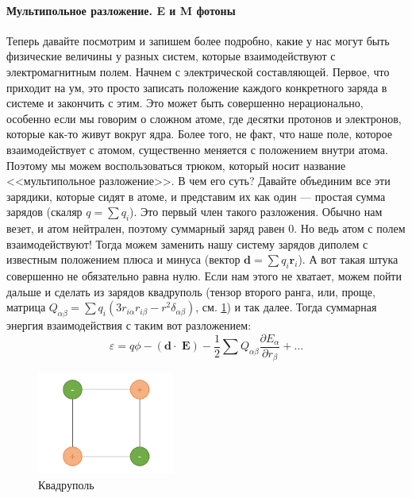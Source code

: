 \documentclass[12pt]{article}
\begin{document}
\paragraph{Мультипольное разложение. E и M фотоны}
Теперь давайте посмотрим и запишем более подробно, какие у нас могут быть физические величины у разных систем, которые взаимодействуют с электромагнитным полем. Начнем с электрической составляющей. Первое, что приходит на ум, это просто записать положение каждого конкретного заряда в системе и закончить с этим. Это может быть совершенно нерационально, особенно если мы говорим о сложном атоме, где десятки протонов и электронов, которые как-то живут вокруг ядра. Более того, не факт, что наше поле, которое взаимодействует с атомом, существенно меняется с положением внутри атома. Поэтому мы можем воспользоваться трюком, который носит название <<мультипольное разложение>>. В чем его суть? Давайте объединим все эти зарядики, которые сидят в атоме, и представим их как один --- простая сумма зарядов (скаляр $q = \sum q_i$). Это первый член такого разложения. Обычно нам везет, и атом нейтрален, поэтому суммарный заряд равен 0. Но ведь атом с полем взаимодействуют! Тогда можем заменить нашу систему зарядов диполем с известным положением плюса и минуса (вектор $\textbf{d} = \sum q_i \textbf{r}_i$). А вот такая штука совершенно не обязательно равна нулю. Если нам этого не хватает, можем пойти дальше и сделать из зарядов квадруполь (тензор второго ранга, или, проще, матрица $Q_{\alpha\beta} = \sum q_i(3r_{i\alpha}r_{i\beta}-r^2\delta_{\alpha\beta}) $, см. \ref{fig:sem_08_quad}) и так далее. Тогда суммарная энергия взаимодействия с таким вот разложением:
\begin{equation*}
    \varepsilon = q\phi - (\textbf{d}\cdot\textbf{ E}) - \dfrac{1}{2}\sum Q_{\alpha\beta}\dfrac{\partial E_{\alpha}}{\partial r_{\beta}}+ \dots
\end{equation*}

\begin{figure}[h]
    \centering
    \includegraphics[width=0.4\textwidth,height=\textheight,keepaspectratio]{Seminar_08/pics/pic_02.pdf}
    \caption{Квадруполь}
    \label{fig:sem_08_quad}
\end{figure}
\end{document}
